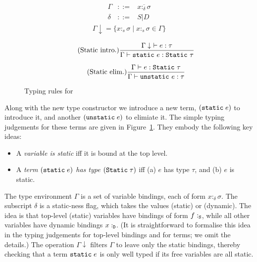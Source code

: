 \documentclass[preprint]{sigplanconf}
\begin{document}
\begin{figure}
\begin{minipage}{\linewidth}
$$
\begin{array}{rcl}
\Gamma & ::= & \overline{x :_{\delta} \sigma} \\
     \delta & ::= & S | D
\end{array}
$$
\begin{align*}
\Gamma\downarrow = \{ x:_{s} \sigma \mid x :_{s} \sigma \in \Gamma \}
\end{align*}

\begin{equation*}
\tag{Static~intro.}
\frac{\Gamma\downarrow~\vdash e : \tau}
     {\Gamma \vdash \text{\tt static}~e : \text{\tt Static}~\tau}
\end{equation*}

\begin{equation*}
\tag{Static~elim.}
\frac{\Gamma \vdash e : \text{\tt Static}~\tau}
     {\Gamma \vdash \text{\tt unstatic}~e : \tau}
\end{equation*}
\end{minipage}
\caption{Typing rules for } \label{fig:static}
\end{figure}
Along with the new type constructor we introduce a new term,
$(\text{\tt static}\;e)$ to introduce it, and another 
$(\text{\tt unstatic}\;e)$ to elimiate it.
The simple typing judgements for these terms are given in Figure~\ref{fig:static}.
They embody the following key ideas:
\begin{itemize}
\item A \emph{variable is static} iff it is bound at the top level.
\item A \emph{term $(\text{\tt static}\;e)$ has type $(\text{\tt Static}\;\tau)$} iff 
(a) $e$ has type $\tau$, and (b) $e$ is static.  
\end{itemize}
The type environment $\Gamma$ is a set of variable bindings, each of form $x :_{\delta} \sigma$.
The subscript $\delta$ is a static-ness flag, which takes the values  (static) or
 (dynamic).  The idea is that top-level (static) variables have bindings
of form $f :_{\text{\tt S}}$, while all other variables have dynamic bindings $x :_{\text{\tt D}}$.
(It is straightforward to formalise this idea in the typing judgements for top-level
bindings and for terms; we omit the details.)
The operation $\Gamma \downarrow$ filters $\Gamma$ to leave only the static bindings,
thereby checking that a term $\text{\tt static}\;e$ is only well typed if its free
variables are all static.
\end{document}
